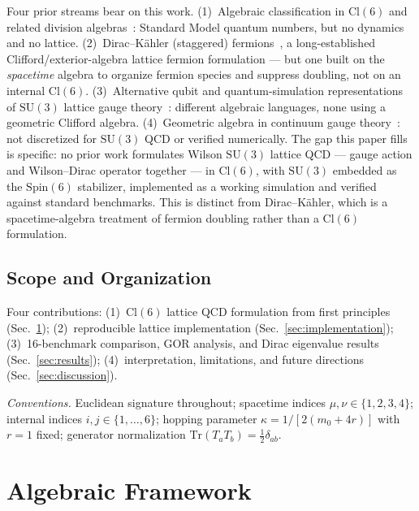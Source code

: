 \documentclass[12pt]{article}
\newcommand{\cl}{\mathrm{Cl}}          %
\newcommand{\spin}{\mathrm{Spin}}
\newcommand{\su}{\mathrm{SU}}
\newcommand{\tr}{\mathrm{Tr}}
\begin{document}
Four prior streams bear on this work.
(1)~Algebraic classification in $\cl(6)$ and related division
algebras~\cite{Furey2012,Furey2014,Furey2015,Furey2018a,Furey2018b,
Dixon1994,Stoica2018}: Standard Model quantum numbers, but no
dynamics and no lattice.
(2)~Dirac--K\"ahler (staggered) fermions~\cite{Kahler1962,BecherJoos1982},
a long-established Clifford/exterior-algebra lattice fermion
formulation --- but one built on the \emph{spacetime} algebra to
organize fermion species and suppress doubling, not on an internal
$\cl(6)$.
(3)~Alternative qubit and quantum-simulation representations of
$\su(3)$ lattice gauge theory~\cite{Zohar2015,Zohar2022,Mathur2016,
Kan2021,Zache2018}: different algebraic languages, none using a
geometric Clifford algebra.
(4)~Geometric algebra in continuum gauge
theory~\cite{Doran2003,Doran1996}: not discretized for $\su(3)$ QCD
or verified numerically.
The gap this paper fills is specific: no prior work formulates Wilson
$\su(3)$ lattice QCD --- gauge action and Wilson--Dirac operator
together --- in $\cl(6)$, with $\su(3)$ embedded as the $\spin(6)$
stabilizer, implemented as a working simulation and verified against
standard benchmarks.  This is distinct from Dirac--K\"ahler, which is
a spacetime-algebra treatment of fermion doubling rather than a
$\cl(6)$ formulation.

\subsection{Scope and Organization}
\label{sec:scope}

Four contributions:
(1)~$\cl(6)$ lattice QCD formulation from first principles
    (Sec.~\ref{sec:framework});
(2)~reproducible lattice implementation
    (Sec.~\ref{sec:implementation});
(3)~16-benchmark comparison, GOR analysis, and Dirac eigenvalue
    results (Sec.~\ref{sec:results});
(4)~interpretation, limitations, and future directions
    (Sec.~\ref{sec:discussion}).

\medskip
\noindent\textit{Conventions.}\enspace
Euclidean signature throughout; spacetime indices
$\mu,\nu\in\{1,2,3,4\}$; internal indices $i,j\in\{1,\ldots,6\}$;
hopping parameter $\kappa = 1/[2(m_0+4r)]$ with $r=1$ fixed;
generator normalization $\tr(T_a T_b)=\tfrac{1}{2}\delta_{ab}$.

\section{Algebraic Framework}
\label{sec:framework}
\end{document}
